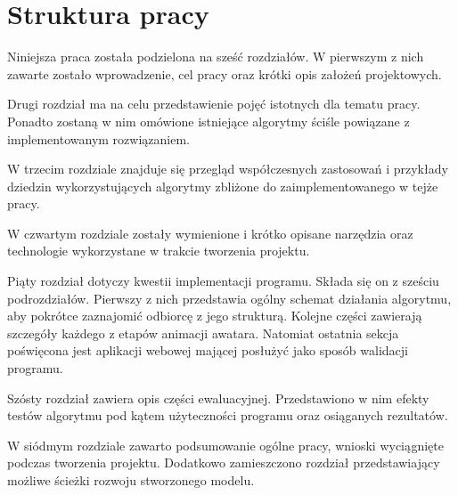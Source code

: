 
\section{Struktura pracy}
\label{sec:strukturaPracy}
Niniejsza praca została podzielona na sześć rozdziałów. W pierwszym z nich zawarte zostało wprowadzenie, cel pracy oraz krótki opis założeń projektowych.

Drugi rozdział ma na celu przedstawienie pojęć istotnych dla tematu pracy. Ponadto zostaną w nim omówione istniejące algorytmy ściśle powiązane z implementowanym rozwiązaniem. 

W trzecim rozdziale znajduje się przegląd współczesnych zastosowań i przykłady dziedzin wykorzystujących algorytmy zbliżone do zaimplementowanego w tejże pracy. 

W czwartym rozdziale zostały wymienione i krótko opisane narzędzia oraz technologie wykorzystane w trakcie tworzenia projektu.

Piąty rozdział dotyczy kwestii implementacji programu. Składa się on z sześciu podrozdziałów. Pierwszy z nich przedstawia ogólny schemat działania algorytmu, aby pokrótce zaznajomić odbiorcę z jego strukturą. Kolejne części zawierają szczegóły każdego z etapów animacji awatara. Natomiat ostatnia sekcja poświęcona jest aplikacji webowej mającej posłużyć jako sposób walidacji programu.

Szósty rozdział zawiera opis części ewaluacyjnej. Przedstawiono w nim efekty testów algorytmu pod kątem użyteczności programu oraz osiąganych rezultatów.

W siódmym rozdziale zawarto podsumowanie ogólne pracy, wnioski wyciągnięte podczas tworzenia projektu. Dodatkowo zamieszczono rozdział przedstawiający możliwe ścieżki rozwoju stworzonego modelu.













